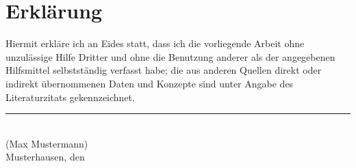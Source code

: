 
\cleardoublepage
\thispagestyle{plain}
\vspace*{\fill}

\section*{Erklärung}

Hiermit erkläre ich an Eides statt, dass ich die vorliegende
Arbeit ohne unzulässige Hilfe Dritter und ohne die Benutzung anderer
als der angegebenen Hilfsmittel selbstständig verfasst habe;
die aus anderen Quellen direkt oder indirekt übernommenen Daten und Konzepte
sind unter Angabe des Literaturzitats gekennzeichnet.

\vskip2cm

\rule{5cm}{0.4pt}\\
(Max Mustermann)\\
Musterhausen, den \duedate